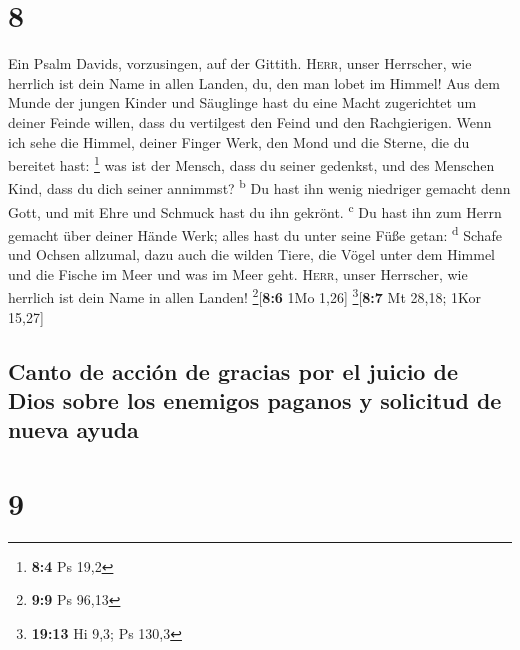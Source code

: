 \hypertarget{section-7}{%
\section{8}\label{section-7}}

 Ein Psalm Davids, vorzusingen, auf der Gittith.
 \textsc{Herr}, unser Herrscher, wie herrlich ist dein
Name in allen Landen, du, den man lobet im Himmel!  Aus
dem Munde der jungen Kinder und Säuglinge hast du eine Macht zugerichtet
um deiner Feinde willen, dass du vertilgest den Feind und den
Rachgierigen.  Wenn ich sehe die Himmel, deiner Finger
Werk, den Mond und die Sterne, die du bereitet hast: \footnote{\textbf{8:4}
  Ps 19,2}  was ist der Mensch, dass du seiner gedenkst,
und des Menschen Kind, dass du dich seiner annimmst? \textsuperscript{b}
 Du hast ihn wenig niedriger gemacht denn Gott, und mit
Ehre und Schmuck hast du ihn gekrönt. \textsuperscript{c} 
Du hast ihn zum Herrn gemacht über deiner Hände Werk; alles hast du
unter seine Füße getan: \textsuperscript{d}  Schafe und
Ochsen allzumal, dazu auch die wilden Tiere,  die Vögel
unter dem Himmel und die Fische im Meer und was im Meer geht.
 \textsc{Herr}, unser Herrscher, wie herrlich ist dein
Name in allen Landen! \footnote{\textbf{9:9} Ps 96,13}{[}\textbf{8:6}
1Mo 1,26{]} \footnote{\textbf{19:13} Hi 9,3; Ps 130,3}{[}\textbf{8:7} Mt
28,18; 1Kor 15,27{]}

\hypertarget{canto-de-acciuxf3n-de-gracias-por-el-juicio-de-dios-sobre-los-enemigos-paganos-y-solicitud-de-nueva-ayuda}{%
\subsection{Canto de acción de gracias por el juicio de Dios sobre los
enemigos paganos y solicitud de nueva
ayuda}\label{canto-de-acciuxf3n-de-gracias-por-el-juicio-de-dios-sobre-los-enemigos-paganos-y-solicitud-de-nueva-ayuda}}

\hypertarget{section-8}{%
\section{9}\label{section-8}}


